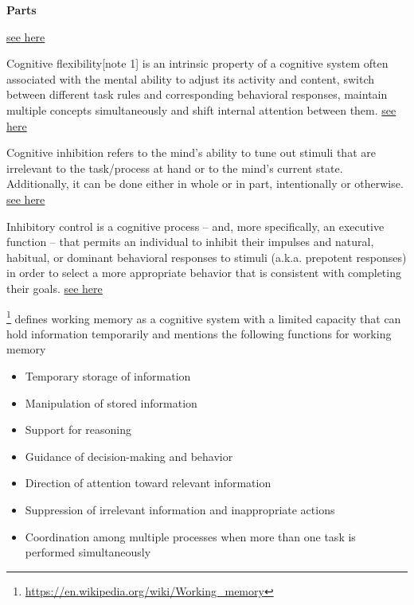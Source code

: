 \documentclass{book}
\newcommand{\seehere}[1]{\href{#1}{see here}}
\providecommand{\ProjectDeepHeading}[2]{%
    \par\medskip\noindent\textbf{#2}\par\smallskip
}
\providecommand{\seehere}[1]{\href{#1}{see here}}
\providecommand{\clickurlfooter}[1]{\footnote{\url{#1}}}
\begin{document}
\ProjectDeepHeading{4}{Parts}


\seehere{https://en.wikipedia.org/wiki/Attentional_control}


Cognitive flexibility[note 1] is an intrinsic property of a cognitive system often associated with the mental ability to adjust its activity and content, switch between different task rules and corresponding behavioral responses, maintain multiple concepts simultaneously and shift internal attention between them. \seehere{https://en.wikipedia.org/wiki/Cognitive_flexibility}


Cognitive inhibition refers to the mind's ability to tune out stimuli that are irrelevant to the task/process at hand or to the mind's current state. Additionally, it can be done either in whole or in part, intentionally or otherwise. \seehere{https://en.wikipedia.org/wiki/Cognitive_inhibition}


Inhibitory control is a cognitive process – and, more specifically, an executive function – that permits an individual to inhibit their impulses and natural, habitual, or dominant behavioral responses to stimuli (a.k.a. prepotent responses) in order to select a more appropriate behavior that is consistent with completing their goals. \seehere{https://en.wikipedia.org/wiki/Inhibitory_control}


\clickurlfooter{https://en.wikipedia.org/wiki/Working_memory} defines working memory as a cognitive system with a limited capacity that can hold information temporarily
    and mentions the following functions for working memory
    \begin{itemize}
        \item Temporary storage of information
        \item Manipulation of stored information
        \item Support for reasoning
        \item Guidance of decision-making and behavior
        \item Direction of attention toward relevant information
        \item Suppression of irrelevant information and inappropriate actions
        \item Coordination among multiple processes when more than one task is performed simultaneously
    \end{itemize}
    
\end{document}
